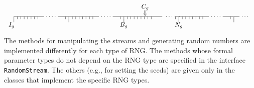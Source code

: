 \begin{latexonly}
\def\tick#1{\vrule height 0pt depth #1pt}
\def\enskip{\hskip.5em\relax}
\def\ld{\hbox to 0.24 in{\vtop{\kern3.0pt\hbox{\dotfill}}}}
\def\ts{\enskip\tick4}
\def\suba{\hbox to 1.2in {\vtop
 {\hbox to 1.2in{\hbox to .66in{\hrulefill}\hbox to .30in{\dotfill}\hrulefill}
  \hbox to 1.2in{\tick9\ts\ts\ts\ts\ts\ts\ts\hfill\ts\enskip}}}}
\def\subb{\hbox to 1.2in {\vtop
 {\hbox to 1.2in{\hbox to .84in {\hrulefill}
         \hbox to .24in {\dotfill}\hbox to .12in {\hrulefill}}
  \hbox to 1.2in{\tick9\ts\ts\ts\ts\ts\ts\ts\ts\hfill\ts\enskip}}}}

$$
\vbox{\offinterlineskip
\hbox to 5.5in{\hskip 2.4in \hbox to 1.2in{\hfil\hskip1.07em $C_g$\hfil}\hfill}
\vskip .1pt
\hbox to 5.5in{\hskip 2.4in \hbox to 1.2in{\hfil\hskip1.07em $\Downarrow$\hfil}
    \hfill}
\vtop {\offinterlineskip\hskip 0.0in \hbox to 5.5 true in
       {\suba\suba\subb\suba\tick9
        \hbox to .12in {\hrulefill}\hbox to .24in{\dotfill}}}\vskip .1pt
\hskip -0.65in\hbox to 1.2 in{\hfil$I_g$\hfil}\hskip 1.25in
  \hbox to 1.2 in{\hfil$B_g$\hfil}\hbox to 1.2 in{\hfil$N_g$\hfil}\hfill
\vskip .1pt }
$$
\end{latexonly}

The methods for manipulating the streams and generating random
numbers are implemented differently for each type of RNG.
The methods whose formal parameter types do not depend
on the RNG type are specified in the interface \texttt{RandomStream}.
The others (e.g., for setting the seeds) are given only in the
classes that implement the specific RNG types.


